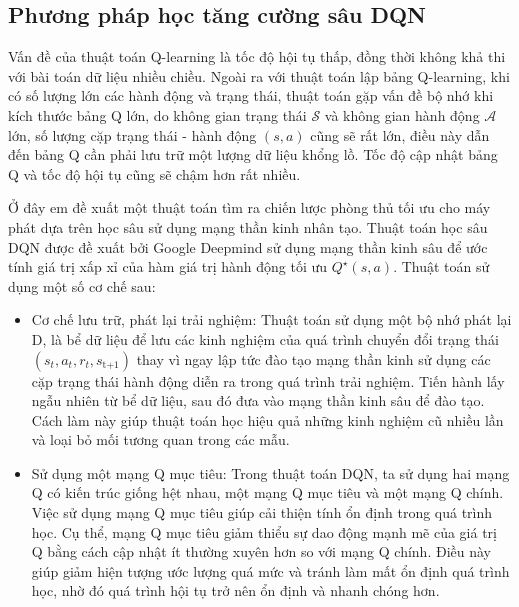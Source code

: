 \documentclass{uetgraduation}
\begin{document}
\subsection{Phương pháp học tăng cường sâu DQN}
Vấn đề của thuật toán Q-learning là tốc độ hội tụ thấp, đồng thời không khả thi với bài toán dữ liệu nhiều chiều. Ngoài ra với thuật toán lập bảng Q-learning,
khi có số lượng lớn các hành động và trạng thái, thuật toán gặp vấn đề bộ nhớ khi kích thước bảng Q lớn, do không gian trạng thái $\mathcal{S}$ và không gian hành động $\mathcal{A}$
lớn, số lượng cặp trạng thái - hành động $(s,a)$ cũng sẽ rất lớn, điều này dẫn đến bảng Q cần phải lưu trữ một lượng dữ liệu khổng lồ. Tốc độ cập nhật bảng Q và tốc độ hội tụ cũng sẽ
chậm hơn rất nhiều.

Ở đây em đề xuất một thuật toán tìm ra chiến lược phòng thủ tối ưu cho máy phát dựa trên học sâu sử dụng mạng thần kinh nhân tạo. Thuật toán học sâu DQN được đề xuất bởi Google Deepmind 
sử dụng mạng thần kinh sâu để ước tính giá trị xấp xỉ của hàm giá trị hành động tối ưu $Q^\star (s, a)$. Thuật toán sử dụng một số cơ chế sau:
\begin{itemize}
    \item Cơ chế lưu trữ, phát lại trải nghiệm: Thuật toán sử dụng một bộ nhớ phát lại D, là bể dữ liệu để lưu các kinh nghiệm của quá trình chuyển đổi trạng thái $(s_t, a_t, r_t, s_\text{t+1})$
    thay vì ngay lập tức đào tạo mạng thần kinh sử dụng các cặp trạng thái hành động diễn ra trong quá trình trải nghiệm. Tiến hành lấy ngẫu nhiên từ bể dữ liệu, sau đó đưa vào
    mạng thần kinh sâu để đào tạo. Cách làm này giúp thuật toán học hiệu quả những kinh nghiệm cũ nhiều lần và loại bỏ mối tương quan trong các mẫu.

    \item  Sử dụng một mạng Q mục tiêu: Trong thuật toán DQN, ta sử dụng hai mạng Q có kiến trúc giống hệt nhau, một mạng Q mục tiêu và một mạng Q chính. Việc sử dụng mạng Q 
    mục tiêu giúp cải thiện tính ổn định trong quá trình học. Cụ thể, mạng Q mục tiêu giảm thiểu sự dao động mạnh mẽ của giá trị Q bằng cách cập nhật ít thường xuyên hơn so với
    mạng Q chính. Điều này giúp giảm hiện tượng ước lượng quá mức và tránh làm mất ổn định quá trình học, nhờ đó quá trình hội tụ trở nên ổn định và nhanh chóng hơn.
\end{itemize}
\end{document}

